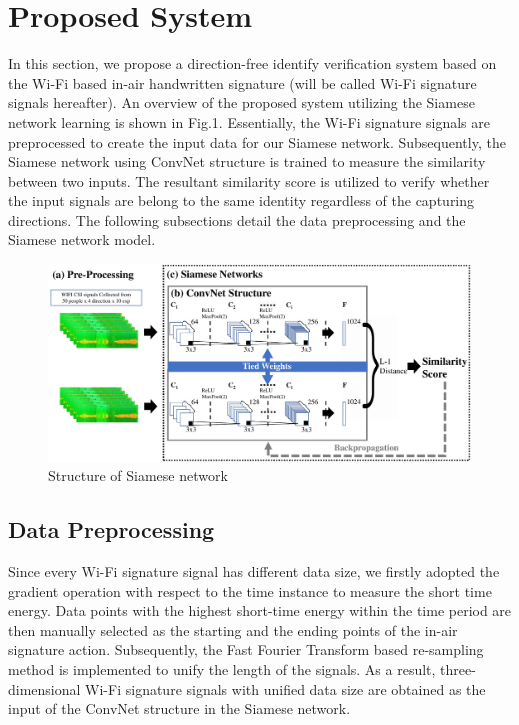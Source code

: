 \documentclass[runningheads]{llncs}
\begin{document}
\section{Proposed System}

In this section, we propose a direction-free identify verification system based on the Wi-Fi based in-air handwritten signature (will be called Wi-Fi signature signals hereafter). An overview of the proposed system utilizing the Siamese network learning is shown in Fig.1.
Essentially, the Wi-Fi signature signals are preprocessed to create the input data for our Siamese network. Subsequently, the Siamese network using ConvNet structure is trained to measure the similarity between two inputs. The resultant similarity score is utilized to verify whether the input signals are belong to the same identity regardless of the capturing directions. The following subsections detail the
data preprocessing and the Siamese network model.

\begin{figure}
    \includegraphics[width=\textwidth]{network3.pdf}
    \caption{Structure of Siamese network} \label{fig1}
\end{figure}

\subsection{Data Preprocessing}

Since every Wi-Fi signature signal has different data size, we firstly adopted the gradient operation with respect to the time instance to measure the short time energy. Data points with the highest short-time energy within the time period are then manually selected as the starting and the ending points of the in-air signature action. Subsequently, the Fast Fourier Transform based re-sampling method \cite{moon2017air} is implemented to unify the length of the signals. As a result, three-dimensional Wi-Fi signature signals with unified data size are obtained as the input of the ConvNet structure in the Siamese network.
\end{document}
